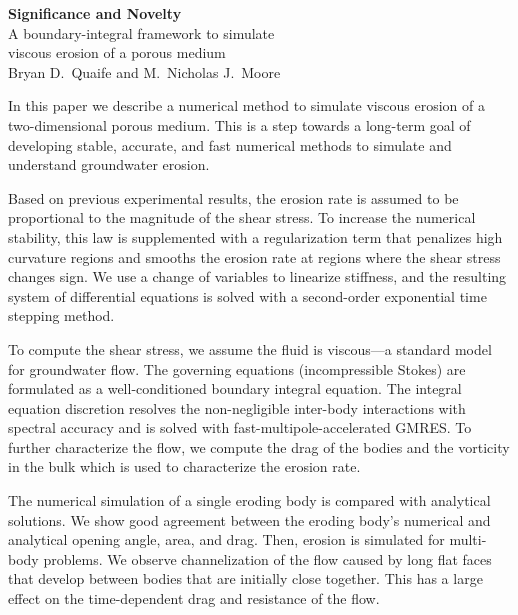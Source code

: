 \documentclass[11pt]{article}
\begin{document}
\begin{center}
  {\bf Significance and Novelty} \\
  A boundary-integral framework to simulate \\ viscous erosion of a
  porous medium \\
  Bryan D.~Quaife and M.~Nicholas J.~Moore
\end{center}
In this paper we describe a numerical method to simulate viscous erosion
of a two-dimensional porous medium.  This is a step towards a long-term
goal of developing stable, accurate, and fast numerical methods to
simulate and understand groundwater erosion.

Based on previous experimental results, the erosion rate is assumed to
be proportional to the magnitude of the shear stress.  To increase the
numerical stability, this law is supplemented with a regularization term
that penalizes high curvature regions and smooths the erosion rate at
regions where the shear stress changes sign.  We use a change of
variables to linearize stiffness, and the resulting system of
differential equations is solved with a second-order exponential time
stepping method.

To compute the shear stress, we assume the fluid is viscous---a standard
model for groundwater flow.  The governing equations (incompressible
Stokes) are formulated as a well-conditioned boundary integral equation.
The integral equation discretion resolves the non-negligible inter-body
interactions with spectral accuracy and is solved with
fast-multipole-accelerated GMRES.  To further characterize the flow, we
compute the drag of the bodies and the vorticity in the bulk which is
used to characterize the erosion rate.

The numerical simulation of a single eroding body is compared with
analytical solutions.  We show good agreement between the eroding body's
numerical and analytical opening angle, area, and drag.  Then, erosion
is simulated for multi-body problems. We observe channelization of the
flow caused by long flat faces that develop between bodies that are
initially close together.  This has a large effect on the time-dependent
drag and resistance of the flow.
\end{document}
